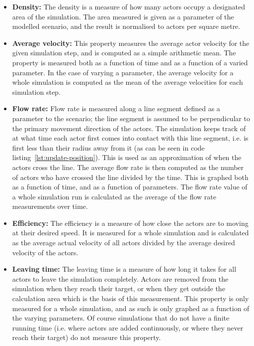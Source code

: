 \begin{itemize}
    \item \textbf{Density:} The density is a measure of how many actors occupy 
        a designated area of the simulation. The area measured is given as a 
        parameter of the modelled scenario, and the result is normalised to 
        actors per square metre.

    \item \textbf{Average velocity:} This property measures the average actor 
        velocity for the given simulation step, and is computed as a simple 
        arithmetic mean. The property is measured both as a function of time 
        and as a function of a varied parameter. In the case of varying a 
        parameter, the average velocity for a whole simulation is computed as 
        the mean of the average velocities for each simulation step.

    \item \textbf{Flow rate:} Flow rate is measured along a line segment 
        defined as a parameter to the scenario; the line segment is assumed to 
        be perpendicular to the primary movement direction of the actors. The 
        simulation keeps track of at what time each actor first comes into 
        contact with this line segment, i.e. is first less than their radius 
        away from it (as can be seen in code 
        listing~\ref{lst:update-position}). This is used as an approximation of 
        when the actors cross the line. The average flow rate is then computed 
        as the number of actors who have crossed the line divided by the time. 
        This is graphed both as a function of time, and as a function of 
        parameters.  The flow rate value of a whole simulation run is 
        calculated as the average of the flow rate measurements over time.

    \item \textbf{Efficiency:} The efficiency is a measure of how close the 
        actors are to moving at their desired speed. It is measured for a 
        whole simulation and is calculated as the average actual velocity of 
        all actors divided by the average desired velocity of the actors.

    \item \textbf{Leaving time:} The leaving time is a measure of how long it 
        takes for all actors to leave the simulation completely. Actors are 
        removed from the simulation when they reach their target, or when they 
        get outside the calculation area which is the basis of this 
        measurement. This property is only measured for a whole simulation, 
        and as such is only graphed as a function of the varying parameters. 
        Of course simulations that do not have a finite running time (i.e. 
        where actors are added continuously, or where they never reach their 
        target) do not measure this property.
\end{itemize}
